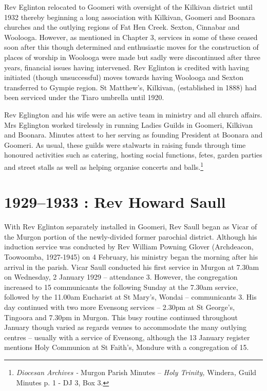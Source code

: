 Rev Eglinton relocated to Goomeri with oversight of the Kilkivan
district until 1932 thereby beginning a long association with Kilkivan,
Goomeri and Boonara churches and the outlying regions of Fat Hen Creek.
Sexton, Cinnabar and Woolooga. However, as mentioned in Chapter 3,
services in some of these ceased soon after this though determined and
enthusiastic moves for the construction of places of worship in Woolooga
were made but sadly were discontinued after three years, financial
issues having intervened. Rev Eglinton is credited with having initiated
(though unsuccessful) moves towards having Woolooga and Sexton
transferred to Gympie region. St Matthew's, Kilkivan, (established in
1888) had been serviced under the Tiaro umbrella until 1920.

Rev Eglington and his wife were an active team in ministry and all
church affairs. Mrs Eglington worked tirelessly in running Ladies Guilds
in Goomeri, Kilkivan and Boonara. Minutes attest to her serving as
founding President at Boonara and Goomeri. As usual, these guilds were
stalwarts in raising funds through time honoured activities such as
catering, hosting social functions, fetes, garden parties and street
stalls as well as helping organise concerts and balls.\footnote{\emph{Diocesan
  Archives -} Murgon Parish Minutes -- \emph{Holy Trinity,}
  Windera\emph{,} Guild Minutes p. 1 - DJ 3, Box 3.}

\printendnotes[custom]
\setcounter{endnote}{0}
\chapter{1929--1933 : Rev Howard Saull}

With Rev Eglinton separately installed in Goomeri, Rev Saull began as
Vicar of the Murgon portion of the newly-divided former parochial
district. Although his induction service was conducted by Rev William
Powning Glover (Archdeacon, Toowoomba, 1927-1945) on 4 February, his
ministry began the morning after his arrival in the parish. Vicar Saull
conducted his first service in Murgon at 7.30am on Wednesday, 2 January
1929 -- attendance 3. However, the congregation increased to 15
communicants the following Sunday at the 7.30am service, followed by the
11.00am Eucharist at St Mary's, Wondai -- communicants 3. His day
continued with two more Evensong services -- 2.30pm at St George's,
Tingoora and 7.30pm in Murgon. This busy routine continued throughout
January though varied as regards venues to accommodate the many outlying
centres -- usually with a service of Evensong, although the 13 January
register mentions Holy Communion at St Faith's, Mondure with a
congregation of 15.

